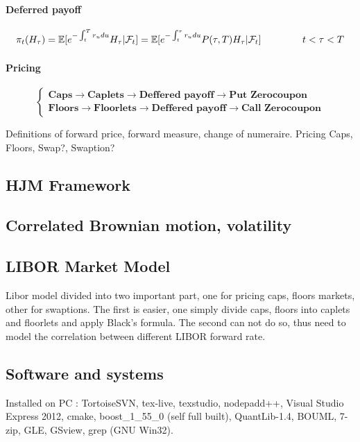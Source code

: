 \documentclass[a4paper,10pt]{article}
\newcommand{\E}{\mathbb{E}}
\newcommand{\F}{\mathcal{F}}
\newcommand{\Discount}[2]{e^{-\int_{#1}^{#2}r_u du} }
\begin{document}
\paragraph{Deferred payoff}
\[
\pi_t(H_{\tau})=\E[\Discount{t}{T}H_{\tau}|\F_t] = \E[\Discount{t}{\tau}P(\tau,T)H_{\tau}|\F_t]
\hspace{1.5cm}
t<\tau<T
\]
\paragraph{Pricing}
\[
\left\{
\begin{array}{l}
\textbf{Caps}\rightarrow\textbf{Caplets}\rightarrow\textbf{Deffered payoff} \rightarrow \textbf{Put Zerocoupon} \\
\textbf{Floors}\rightarrow\textbf{Floorlets}\rightarrow\textbf{Deffered payoff} \rightarrow \textbf{Call Zerocoupon}
\end{array}
\right.
\]



Definitions of forward price, forward measure, change of numeraire. Pricing Caps, Floors, Swap?, Swaption?

\subsection{HJM Framework}
\subsection{Correlated Brownian motion, volatility}
\subsection{LIBOR Market Model}
Libor model divided into two important part, one for pricing caps, floors markets, other for swaptions. The first is easier, one simply divide caps, floors into caplets and floorlets and apply Black's formula. The second can not do so, thus need to model the correlation between different LIBOR forward rate.
\subsection{Software and systems}
Installed on PC : TortoiseSVN, tex-live, texstudio, nodepadd++, Visual Studio Express 2012, cmake, boost\_1\_55\_0 (self full built), QuantLib-1.4, BOUML, 7-zip, GLE, GSview, grep (GNU Win32). 
\end{document}
